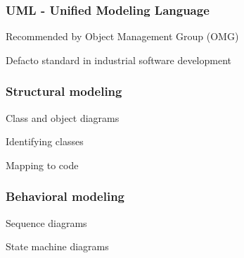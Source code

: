 \subsubsection{UML - Unified Modeling Language}
\enumstart
	\item Recommended by Object Management Group (OMG)
	\item Defacto standard in industrial software development
\enumend

\subsubsection{Structural modeling}
\enumstart
	\item Class and object diagrams
	\item Identifying classes
	\item Mapping to code
\enumend

\subsubsection{Behavioral modeling}
\enumstart
	\item Sequence diagrams
	\item State machine diagrams
\enumend

